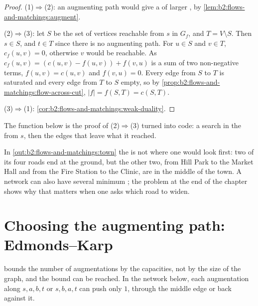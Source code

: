 \begin{proof}
(1)$\Rightarrow$(2): an augmenting path would give a  of larger , by \cref{lem:b2:flows-and-matchings:augment}.

(2)$\Rightarrow$(3): let $S$ be the set of vertices reachable from $s$ in $G_f$, and $T = V \setminus S$. Then $s \in S$,
and $t \in T$ since there is no augmenting path. For $u \in S$ and $v \in T$, $c_f(u, v) = 0$, otherwise $v$ would be
reachable. As $c_f(u, v) = (c(u, v) - f(u, v)) + f(v, u)$ is a sum of two non-negative terms, $f(u, v) = c(u, v)$ and
$f(v, u) = 0$. Every edge from $S$ to $T$ is saturated and every edge from $T$ to $S$ empty, so by
\cref{prop:b2:flows-and-matchings:flow-across-cut}, $|f| = f(S, T) = c(S, T)$.

(3)$\Rightarrow$(1): \cref{cor:b2:flows-and-matchings:weak-duality}.
\end{proof}

The function  below is the proof of (2)$\Rightarrow$(3) turned into
code: a search in the  from $s$, then the edges that leave what it reached.

\label{lst:b2:flows-and-matchings:min-cut}

In \cref{out:b2:flows-and-matchings:town} the  is not where one would look first: two of its four roads end at the
ground, but the other two, from Hill Park to the Market Hall and from the Fire Station to the Clinic, are in the middle
of the town. A network can also have several minimum ; the problem at the end of the chapter shows why that
matters when one asks which road to widen.

\section{Choosing the augmenting path: Edmonds--Karp}\label{sec:b2:flows-and-matchings:edmonds-karp}

 bounds the number of augmentations by the capacities, not by the size of
the graph, and the bound can be reached. In the network below, each augmentation along $s, a, b, t$ or $s, b, a, t$ can
push only $1$, through the middle edge or back against it.

